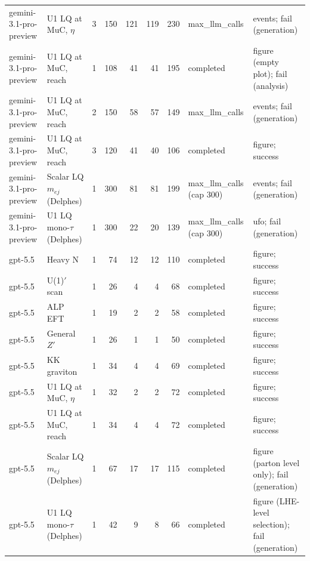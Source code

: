 \begin{tabular}{llrrrrrll}
gemini-3.1-pro-preview & U1 LQ at MuC, $\eta$ & 3 & 150 & 121 & 119 & 230 & max\_llm\_calls & events; fail (generation) \\
gemini-3.1-pro-preview & U1 LQ at MuC, reach & 1 & 108 & 41 & 41 & 195 & completed & figure (empty plot); fail (analysis) \\
gemini-3.1-pro-preview & U1 LQ at MuC, reach & 2 & 150 & 58 & 57 & 149 & max\_llm\_calls & events; fail (generation) \\
gemini-3.1-pro-preview & U1 LQ at MuC, reach & 3 & 120 & 41 & 40 & 106 & completed & figure; success \\
gemini-3.1-pro-preview & Scalar LQ $m_{ej}$ (Delphes) & 1 & 300 & 81 & 81 & 199 & max\_llm\_calls (cap 300) & events; fail (generation) \\
gemini-3.1-pro-preview & U1 LQ mono-$\tau$ (Delphes) & 1 & 300 & 22 & 20 & 139 & max\_llm\_calls (cap 300) & ufo; fail (generation) \\
gpt-5.5 & Heavy N & 1 & 74 & 12 & 12 & 110 & completed & figure; success \\
gpt-5.5 & U(1)$'$ scan & 1 & 26 & 4 & 4 & 68 & completed & figure; success \\
gpt-5.5 & ALP EFT & 1 & 19 & 2 & 2 & 58 & completed & figure; success \\
gpt-5.5 & General $Z'$ & 1 & 26 & 1 & 1 & 50 & completed & figure; success \\
gpt-5.5 & KK graviton & 1 & 34 & 4 & 4 & 69 & completed & figure; success \\
gpt-5.5 & U1 LQ at MuC, $\eta$ & 1 & 32 & 2 & 2 & 72 & completed & figure; success \\
gpt-5.5 & U1 LQ at MuC, reach & 1 & 34 & 4 & 4 & 72 & completed & figure; success \\
gpt-5.5 & Scalar LQ $m_{ej}$ (Delphes) & 1 & 67 & 17 & 17 & 115 & completed & figure (parton level only); fail (generation) \\
gpt-5.5 & U1 LQ mono-$\tau$ (Delphes) & 1 & 42 & 9 & 8 & 66 & completed & figure (LHE-level selection); fail (generation) \\
\bottomrule
\end{tabular}
